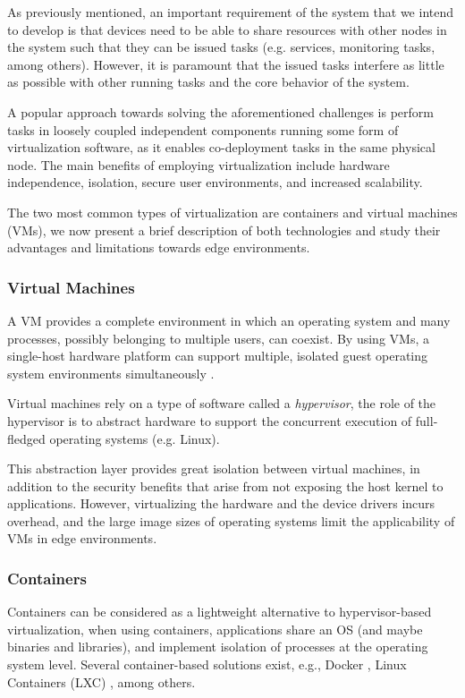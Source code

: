 
As previously mentioned, an important requirement of the system that we intend to develop is that devices need to be able to share resources with other nodes in the system such that they can be issued tasks (e.g. services, monitoring tasks, among others). However, it is paramount that the issued tasks interfere as little as possible with other running tasks and the core behavior of the system.

A popular approach towards solving the aforementioned challenges is perform tasks in loosely coupled independent components running some form of virtualization software, as it enables co-deployment tasks in the same physical node. The main benefits of employing virtualization include hardware independence, isolation, secure user environments, and increased scalability. 

The two most common types of virtualization are containers and virtual machines (VMs), we now present a brief description of both technologies and study their advantages and limitations towards edge environments. 

\subsubsection{Virtual Machines}

A VM provides a complete environment in which an operating system and many processes, possibly belonging to multiple users, can coexist. By using VMs, a single-host hardware platform can support multiple, isolated guest operating system environments simultaneously \cite{1430629}. 

Virtual machines rely on a type of software called a \textit{hypervisor}, the role of the hypervisor is to abstract hardware to support the concurrent execution of full-fledged operating systems (e.g. Linux). 

This abstraction layer provides great isolation between virtual machines, in addition to the security benefits that arise from not exposing the host kernel to applications. However, virtualizing the hardware and the device drivers incurs overhead, and the large image sizes of operating systems limit the applicability of VMs in edge environments.

\subsubsection{Containers}

Containers can be considered as a lightweight alternative to hypervisor-based virtualization, when using containers, applications share an OS (and maybe binaries and libraries), and implement isolation of processes at the operating system level. Several container-based solutions exist, e.g., Docker \cite{docker}, Linux Containers (LXC) \cite{lxc}, among others. 

